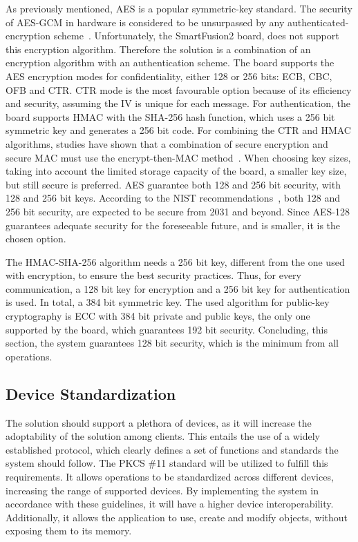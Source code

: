 As previously mentioned, \ac{AES} is a popular symmetric-key standard. The security of \ac{AES}-\ac{GCM} in hardware is considered to be unsurpassed by any authenticated-encryption scheme~\cite{aesmodes}.
Unfortunately, the SmartFusion2 board, does not support this encryption algorithm. Therefore the solution is a combination of an encryption algorithm with an authentication scheme. The board supports the \ac{AES} encryption modes for confidentiality, either 128 or 256 bits: \ac{ECB}, \ac{CBC}, \ac{OFB} and \ac{CTR}. CTR mode is the most favourable option because of its efficiency and security, assuming the IV is unique for each message.
For authentication, the board supports \ac{HMAC} with the \ac{SHA}-256 hash function, which uses a 256 bit symmetric key and generates a 256 bit code. For combining the CTR and HMAC algorithms, studies have shown that a combination of secure encryption and secure MAC must use the encrypt-then-MAC method~\cite{encryptmacorder}.
When choosing key sizes, taking into account the limited storage capacity of the board, a smaller key size, but still secure is preferred. \ac{AES} guarantee both 128 and 256 bit security, with 128 and 256 bit keys. According to the \ac{NIST} recommendations~\cite{nistRecommendations}, both 128 and 256 bit security, are expected to be secure from 2031 and beyond. Since \ac{AES}-128 guarantees adequate security for the foreseeable future, and is smaller, it is the chosen option.

The \ac{HMAC}-\ac{SHA}-256 algorithm needs a 256 bit key, different from the one used with encryption, to ensure the best security practices. Thus, for every communication, a 128 bit key for encryption and a 256 bit key for authentication is used. In total, a 384 bit symmetric key.
The used algorithm for public-key cryptography is \ac{ECC} with 384 bit private and public keys, the only one supported by the board, which guarantees 192 bit security.
Concluding, this section, the system guarantees 128 bit security, which is the minimum from all operations.

\subsection{Device Standardization}\label{chap:implementation:tools:standardization}

The solution should support a plethora of devices, as it will increase the adoptability of the solution among clients. This entails the use of a widely established protocol, which clearly defines a set of functions and standards the system should follow.
The \ac{PKCS} \#11 standard will be utilized to fulfill this requirements. It allows operations to be standardized across different devices, increasing the range of supported devices. By implementing the system in accordance with these guidelines, it will have a higher device interoperability. Additionally, it allows the application to use, create and modify objects, without exposing them to its memory.

